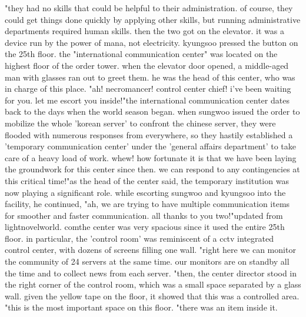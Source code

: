 "they had no skills that could be helpful to their administration.
 of course, they could get things done quickly by applying other skills, but running administrative departments required human skills.
then the two got on the elevator.
 it was a device run by the power of mana, not electricity.
kyungsoo pressed the button on the 25th floor.
 the "international communication center" was located on the highest floor of the order tower.
when the elevator door opened, a middle-aged man with glasses ran out to greet them.
 he was the head of this center, who was in charge of this place.
"ah! necromancer! control center chief! i've been waiting for you.
 let me escort you inside!"the international communication center dates back to the days when the world season began.
when sungwoo issued the order to mobilize the whole 'korean server' to confront the chinese server, they were flooded with numerous responses from everywhere, so they hastily established a 'temporary communication center' under the 'general affairs department' to take care of a heavy load of work.
 whew! how fortunate it is that we have been laying the groundwork for this center since then.
 we can respond to any contingencies at this critical time!"as the head of the center said, the temporary institution was now playing a significant role.
 while escorting sungwoo and kyungsoo into the facility, he continued, "ah, we are trying to have multiple communication items for smoother and faster communication.
 all thanks to you two!"updated from lightnovelworld.
comthe center was very spacious since it used the entire 25th floor.
 in particular, the 'control room' was reminiscent of a cctv integrated control center, with dozens of screens filling one wall.
"right here we can monitor the community of 24 servers at the same time.
 our monitors are on standby all the time and to collect news from each server.
"then, the center director stood in the right corner of the control room, which was a small space separated by a glass wall.
 given the yellow tape on the floor, it showed that this was a controlled area.
"this is the most important space on this floor.
"there was an item inside it.
 

